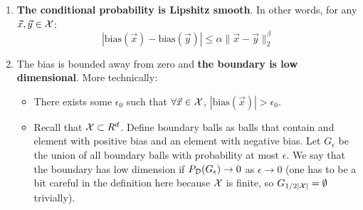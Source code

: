 \documentclass{article}
\newcommand{\X}{{\cal X}}
\newcommand{\D}{{\cal D}}
\newcommand{\x}{\vec{x}}
\newcommand{\y}{\vec{y}}
\newcommand{\bias}{\text{bias}}
\begin{document}
\begin{enumerate}
\item
  {\bf The conditional probability is Lipshitz smooth}. In other words, for
any $\x,\y \in \X$:
\[
|\bias(\x) - \bias(\y)| \leq \alpha \|\x-\y\|_2^{\beta}
\]
\item
The bias is bounded away from zero and {\bf the boundary is low
dimensional}. More technically:
\begin{itemize}
\item There exists some $\epsilon_0$ such that $\forall \x \in \X$, $|\bias(\x)|>\epsilon_0$.
\item Recall that $\X \subset R^d$. Define boundary balls as balls
  that contain and element with positive bias and an element with
  negative bias. Let $G_{\epsilon}$ be the union of all boundary balls
  with probability at most $\epsilon$. We say that the boundary has
  low dimension if $P_{\D}(G_{\epsilon}) \to 0$ as $\epsilon \to 0$
  (one has to be a bit careful in the definition here because $\X$ is finite, so
  $G_{1/2|\X|}=\emptyset$ trivially).  
\end{itemize}
\end{enumerate}


\appendix
\end{document}
